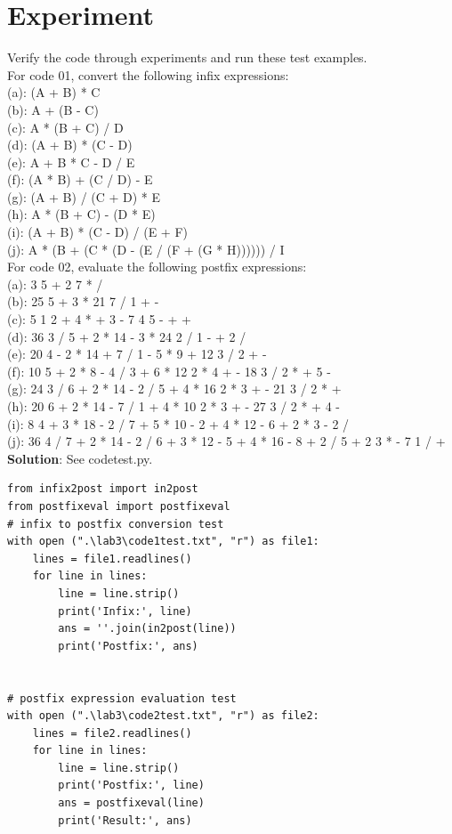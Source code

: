 \documentclass[UTF8]{ctexart}
\begin{document}
\section{Experiment}
Verify the code through experiments and run these test examples.\\
For code 01, convert the following infix expressions:\\
(a): (A + B) * C\\
(b): A + (B - C)\\
(c): A * (B + C) / D\\
(d): (A + B) * (C - D)\\
(e): A + B * C - D / E\\
(f): (A * B) + (C / D) - E\\
(g): (A + B) / (C + D) * E\\
(h): A * (B + C) - (D * E)\\
(i): (A + B) * (C - D) / (E + F)\\
(j): A * (B + (C * (D - (E / (F + (G * H)))))) / I\\

For code 02, evaluate the following postfix expressions:\\
(a): 3 5 + 2 7 * /\\
(b): 25 5 + 3 * 21 7 / 1 + -\\
(c): 5 1 2 + 4 * + 3 - 7 4 5 - + +\\
(d): 36 3 / 5 + 2 * 14 - 3 * 24 2 / 1 - + 2 /\\
(e): 20 4 - 2 * 14 + 7 / 1 - 5 * 9 + 12 3 / 2 + -\\
(f): 10 5 + 2 * 8 - 4 / 3 + 6 * 12 2 * 4 + - 18 3 / 2 * + 5 -\\
(g): 24 3 / 6 + 2 * 14 - 2 / 5 + 4 * 16 2 * 3 + - 21 3 / 2 * +\\
(h): 20 6 + 2 * 14 - 7 / 1 + 4 * 10 2 * 3 + - 27 3 / 2 * + 4 -\\
(i): 8 4 + 3 * 18 - 2 / 7 + 5 * 10 - 2 + 4 * 12 - 6 + 2 * 3 - 2 /\\
(j): 36 4 / 7 + 2 * 14 - 2 / 6 + 3 * 12 - 5 + 4 * 16 - 8 + 2 / 5 + 2 3 * - 7 1 / +\\
\textbf{Solution}: See codetest.py.
\begin{lstlisting}
from infix2post import in2post
from postfixeval import postfixeval
# infix to postfix conversion test
with open (".\lab3\code1test.txt", "r") as file1:
    lines = file1.readlines()
    for line in lines:
        line = line.strip()
        print('Infix:', line)
        ans = ''.join(in2post(line))
        print('Postfix:', ans)


# postfix expression evaluation test
with open (".\lab3\code2test.txt", "r") as file2:
    lines = file2.readlines()
    for line in lines:
        line = line.strip()
        print('Postfix:', line)
        ans = postfixeval(line)
        print('Result:', ans)
\end{lstlisting}
\end{document}
